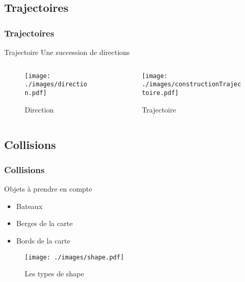 \subsection{Trajectoires}
 \begin{frame}[c]
\frametitle{Trajectoires}
   \begin{block}{Trajectoire}
     Une succession de directions
   \end{block}
  \begin{columns}
    \begin{column}[l]{5cm}
      \begin{figure}[!h]
        \begin{center}
          \texttt{[image: ./images/direction.pdf]}
        \end{center}
        \caption{Direction}
      \end{figure}
    \end{column}
    \begin{column}[r]{5cm}
      \begin{figure}[!h]
        \begin{center}
          \texttt{[image: ./images/constructionTrajectoire.pdf]}
        \end{center}
        \caption{Trajectoire}
      \end{figure}
    \end{column}
  \end{columns}
\end{frame}

\subsection{Collisions}
 \begin{frame}[c]
\frametitle{Collisions}
   \begin{block}{Objets à prendre en compte}
     \begin{itemize}
     \item Bateaux
     \item Berges de la carte
     \item Bords de la carte
     \end{itemize}
   \end{block}
         \begin{figure}[!h]
    \begin{center}
      \texttt{[image: ./images/shape.pdf]}
    \end{center}
    \caption{Les types de shape}
  \end{figure}
 \end{frame}
